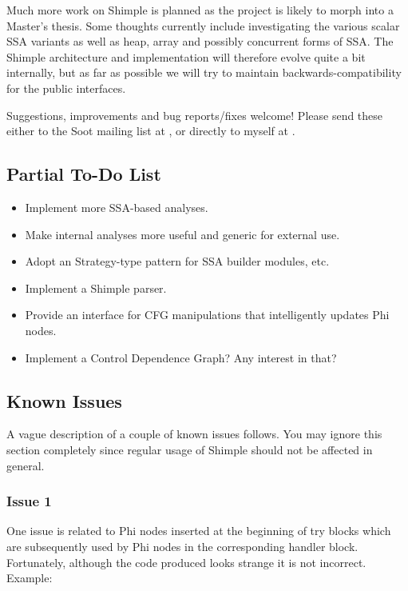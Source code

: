 \documentclass[10pt,letterpaper,oneside,onecolumn]{article}
\begin{document}
Much more work on Shimple is planned as the project is likely to morph
into a Master's thesis.  Some thoughts currently include investigating
the various scalar SSA variants as well as heap, array and possibly
concurrent forms of SSA.  The Shimple architecture and implementation
will therefore evolve quite a bit internally, but as far as possible
we will try to maintain backwards-compatibility for the public
interfaces.

Suggestions, improvements and bug reports/fixes welcome!  Please send
these either to the Soot mailing list at
, or directly to myself
at
.

\subsection{Partial To-Do List}

\begin{itemize}
\item Implement more SSA-based analyses.
\item Make internal analyses more useful and generic for external use.
\item Adopt an Strategy-type pattern for SSA builder modules, etc.
\item Implement a Shimple parser.
\item Provide an interface for CFG manipulations that intelligently 
updates Phi nodes.
\item Implement a Control Dependence Graph?  Any interest in that?
\end{itemize}

\subsection{Known Issues}

A vague description of a couple of known issues follows.  You may
ignore this section completely since regular usage of Shimple should
not be affected in general.

\subsubsection{Issue 1}

One issue is related to Phi nodes inserted at the beginning of try
blocks which are subsequently used by Phi nodes in the corresponding
handler block.  Fortunately, although the code produced looks strange
it is not incorrect.  Example:
\end{document}
